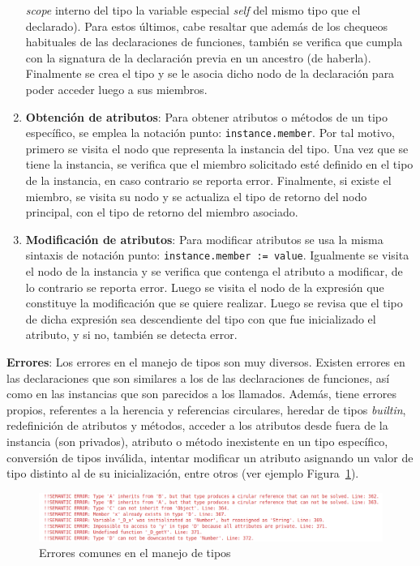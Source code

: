 \documentclass{llncs}
\begin{document}
\begin{enumerate}
    \textit{scope} interno del tipo la variable especial \textit{self} del mismo tipo que el declarado). Para estos últimos, cabe resaltar que además de los chequeos habituales de las declaraciones de funciones, también se verifica que cumpla con la signatura de la declaración previa en
    un ancestro (de haberla). Finalmente se crea el tipo y se le asocia dicho nodo de la declaración para poder acceder luego a sus miembros.
    \item \textbf{Obtención de atributos}: Para obtener atributos o métodos de un tipo específico, se emplea la notación punto: \texttt{instance.member}. Por tal motivo, primero se visita el nodo que representa la instancia del tipo. Una vez que se tiene la instancia, se verifica que el miembro 
    solicitado esté definido en el tipo de la instancia, en caso contrario se reporta error. Finalmente, si existe el miembro, se visita su nodo y se actualiza el tipo de retorno del nodo principal, con el tipo de retorno del miembro asociado.
    \item \textbf{Modificación de atributos}: Para modificar atributos se usa la misma sintaxis de notación punto: \texttt{instance.member := value}. Igualmente se visita el nodo de la instancia y se verifica que contenga el atributo a modificar, de lo contrario se reporta error. Luego 
    se visita el nodo de la expresión que constituye la modificación que se quiere realizar. Luego se revisa que el tipo de dicha expresión sea descendiente del tipo con que fue inicializado el atributo, y si no, también se detecta error.
\end{enumerate}

\textbf{Errores}: Los errores en el manejo de tipos son muy diversos. Existen errores en las declaraciones que son similares a los de las declaraciones de funciones, así como en las instancias que son parecidos a los llamados. Además, tiene errores propios, referentes a la herencia y referencias circulares, 
heredar de tipos \textit{builtin}, redefinición de atributos y métodos, acceder a los atributos desde fuera de la instancia (son privados), atributo o método inexistente en un tipo específico, conversión de tipos inválida, intentar modificar un atributo asignando un valor de tipo distinto al de su inicialización, 
entre otros (ver ejemplo Figura~\ref{fig:errores_5}).
\begin{figure}[h]
\centering
\includegraphics[width=1\textwidth]{images/type_errors.png}
\caption{Errores comunes en el manejo de tipos}
\label{fig:errores_5}
\end{figure}
\end{document}
